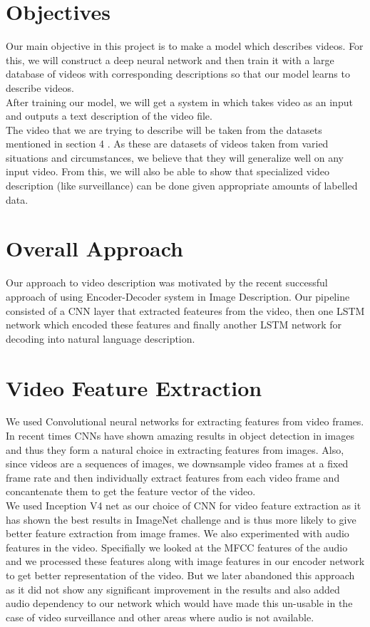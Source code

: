 \documentclass[11pt]{article}
\begin{document}
	\section{Objectives}
		Our main objective in this project is to make a model which describes videos. For this, we will construct a deep neural network and then train it with a large database of videos with corresponding descriptions so that our model learns to describe videos.\\
		After training our model, we will get a system in which takes video as an input and outputs a text description of the video file.\\
		The video that we are trying to describe will be taken from the datasets mentioned in section 4 . As these are datasets of videos taken from varied situations and circumstances, we believe that they will generalize well on any input video. From this, we will also be able to show that specialized video description (like surveillance) can be done given appropriate amounts of labelled data.

\section{Overall Approach}
	Our approach to video description was motivated by the recent successful approach of using Encoder-Decoder system in Image Description.
	Our pipeline consisted of a CNN layer that extracted feateures from the video, then one LSTM network which encoded these features and finally
	another LSTM network for decoding into natural language description.
\section {Video Feature Extraction}
	We used Convolutional neural networks for extracting features from video frames. In recent times CNNs have shown amazing results in object
	detection in images and thus they form a natural choice in extracting features from images. Also, since videos are a sequences of images, we
	downsample video frames at a fixed frame rate and then individually extract features from each video frame and concantenate them to get 
	the feature vector of the video.\\
	We used Inception V4 net as our choice of CNN for video feature extraction as it has shown the best results in ImageNet challenge and is thus
	more likely to give better feature extraction from image frames. We also experimented with audio features in the video. Specifially we looked
	at the MFCC features of the audio and we processed these features along with image features in our encoder network to get better representation
	of the video. But we later abandoned this approach as it did not show any significant improvement in the results and also added audio dependency
	to our network which would have made this un-usable in the case of video surveillance and other areas where audio is not available.
\end{document}
